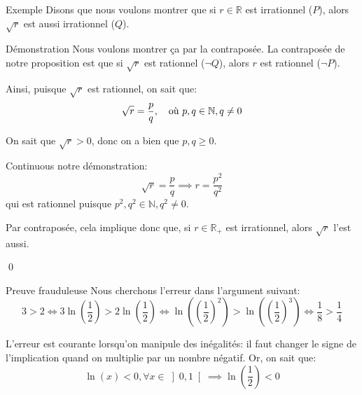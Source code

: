 \documentclass[a4paper]{article}
\begin{document}
\begin{parag}{Exemple}
    Disons que nous voulons montrer que si $r \in \mathbb{R}$ est irrationnel ($P$), alors $\sqrt{r}$ est aussi irrationnel ($Q$).

    \begin{subparag}{Démonstration}
        Nous voulons montrer ça par la contraposée. La contraposée de notre proposition est que si $\sqrt{r}$ est rationnel ($\lnot Q$), alors $r$ est rationnel ($\lnot P$).


        Ainsi, puisque $\sqrt{r}$ est rationnel, on sait que: 
        \[\sqrt{r} = \frac{p}{q}, \quad \text{où } p, q \in \mathbb{N}, q \neq 0\]
        
        On sait que $\sqrt{r} > 0$, donc on a bien que $p, q \geq 0$.

        Continuous notre démonstration: 
        \[\sqrt{r} = \frac{p}{q} \implies r = \frac{p^2}{q^2}\]
        qui est rationnel puisque $p^2, q^2 \in \mathbb{N}, q^2 \neq 0$.

        Par contraposée, cela implique donc que, si $r \in \mathbb{R}_+$ est irrationnel, alors $\sqrt{r}$ l'est aussi.

        \qed
    \end{subparag}
\end{parag}

\begin{parag}{Preuve frauduleuse}
    Nous cherchons l'erreur dans l'argument suivant:
    \[3 > 2 \iff 3\ln\left(\frac{1}{2}\right) > 2\ln\left(\frac{1}{2}\right) \iff \ln\left(\left(\frac{1}{2}\right)^2\right) > \ln\left(\left(\frac{1}{2}\right)^3\right) \iff \frac{1}{8} > \frac{1}{4}\]

    L'erreur est courante lorsqu'on manipule des inégalités: il faut changer le signe de l'implication quand on multiplie par un nombre négatif. Or, on sait que: 
    \[\ln\left(x\right) < 0, \forall x \in \left]0, 1\right[ \implies \ln\left(\frac{1}{2}\right) < 0\]
    
\end{parag}
\end{document}
